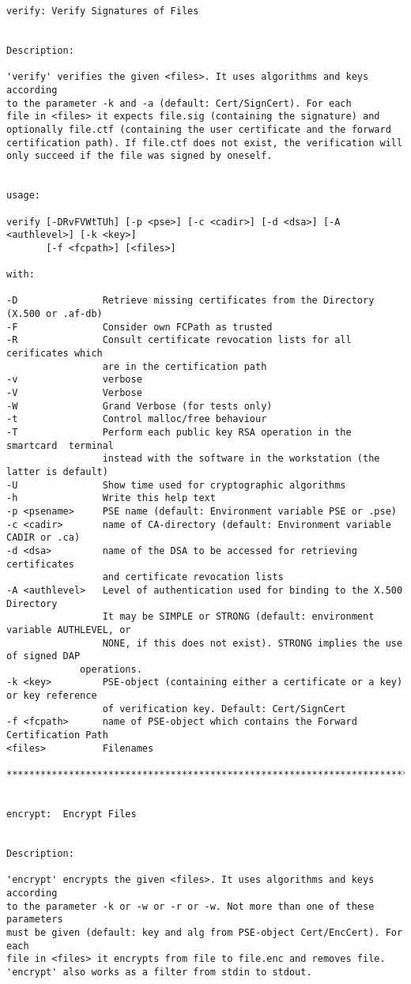 {\begin{verbatim}
verify: Verify Signatures of Files


Description:

'verify' verifies the given <files>. It uses algorithms and keys according
to the parameter -k and -a (default: Cert/SignCert). For each
file in <files> it expects file.sig (containing the signature) and
optionally file.ctf (containing the user certificate and the forward
certification path). If file.ctf does not exist, the verification will
only succeed if the file was signed by oneself.


usage:

verify [-DRvFVWtTUh] [-p <pse>] [-c <cadir>] [-d <dsa>] [-A <authlevel>] [-k <key>] 
       [-f <fcpath>] [<files>]

with:

-D               Retrieve missing certificates from the Directory (X.500 or .af-db)
-F               Consider own FCPath as trusted
-R               Consult certificate revocation lists for all cerificates which
                 are in the certification path
-v               verbose
-V               Verbose
-W               Grand Verbose (for tests only)
-t               Control malloc/free behaviour
-T               Perform each public key RSA operation in the smartcard  terminal
                 instead with the software in the workstation (the latter is default)
-U               Show time used for cryptographic algorithms
-h               Write this help text
-p <psename>     PSE name (default: Environment variable PSE or .pse)
-c <cadir>       name of CA-directory (default: Environment variable CADIR or .ca)
-d <dsa>         name of the DSA to be accessed for retrieving certificates
                 and certificate revocation lists
-A <authlevel>   Level of authentication used for binding to the X.500 Directory
                 It may be SIMPLE or STRONG (default: environment variable AUTHLEVEL, or 
                 NONE, if this does not exist). STRONG implies the use of signed DAP 
	         operations.
-k <key>         PSE-object (containing either a certificate or a key) or key reference 
                 of verification key. Default: Cert/SignCert
-f <fcpath>      name of PSE-object which contains the Forward Certification Path
<files>          Filenames

****************************************************************************************


encrypt:  Encrypt Files


Description:

'encrypt' encrypts the given <files>. It uses algorithms and keys according
to the parameter -k or -w or -r or -w. Not more than one of these parameters
must be given (default: key and alg from PSE-object Cert/EncCert). For each
file in <files> it encrypts from file to file.enc and removes file.
'encrypt' also works as a filter from stdin to stdout.



\end{verbatim}}
